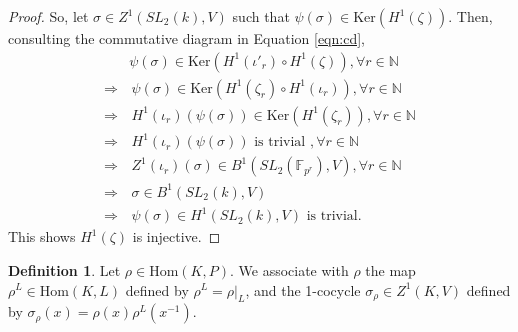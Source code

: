 \documentclass[12pt]{amsart}
\numberwithin{equation}{section}
\theoremstyle{definition}
\newtheorem{defn}[equation]{Definition}
\theoremstyle{remark}
\theoremstyle{remark}
\begin{document}
\begin{proof}
So, let $\sigma \in Z^1(SL_2(k), V)$ such that $\psi(\sigma) \in \mathrm{Ker}\left(H^1(\zeta)\right)$.
Then, consulting the commutative diagram in Equation \ref{eqn:cd},
\begin{align*}
	&\psi(\sigma) \in \mathrm{Ker}\left(H^1(\iota'_r) \circ H^1(\zeta)\right), \forall r \in \mathbb{N} \\
	\Rightarrow &\,\psi(\sigma) \in \mathrm{Ker}\left(H^1(\zeta_r) \circ H^1(\iota_r)\right), \forall r \in \mathbb{N}  \\
	\Rightarrow &\,H^1(\iota_r)(\psi(\sigma)) \in \mathrm{Ker}\left(H^1(\zeta_r)\right), \forall r \in \mathbb{N}  \\
	\Rightarrow &\,H^1(\iota_r)(\psi(\sigma))\textrm{ is trivial }, \forall r \in \mathbb{N} \\%
	\Rightarrow &\,Z^1(\iota_r)(\sigma) \in B^1(SL_2(\mathbb{F}_{p^r}), V), \forall r \in \mathbb{N}  \\
	\Rightarrow &\,\sigma \in B^1(SL_2(k), V) \\ %
	\Rightarrow &\,\psi(\sigma) \in H^1(SL_2(k), V) \textrm{ is trivial}.
\end{align*}
This shows $H^1(\zeta)$ is injective.
\end{proof}

\begin{defn} Let $\rho \in \mathrm{Hom}(K, P)$. We associate with $\rho$ the map $\rho^L \in \mathrm{Hom}(K, L)$ defined by
$\rho^L = \rho|_L$,
and the 1-cocycle $\sigma_\rho \in Z^1(K, V)$ defined by
$\sigma_\rho(x) = \rho(x)\rho^L(x^{-1})$.
\end{defn}
\end{document}
